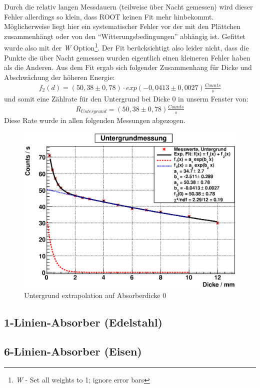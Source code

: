 \documentclass[12pt]{article}
\begin{document}
Durch die relativ langen Messdauern (teilweise über Nacht gemessen) wird dieser Fehler allerdings so klein, dass ROOT keinen Fit mehr hinbekommt.
Möglicherweise liegt hier ein systematischer Fehler vor der mit den Plättchen zusammenhängt oder von den ``Witterungsbedingungen'' abhängig ist.
Gefittet wurde also mit der \textit{W} Option\footnote{\textit{W} - Set all weights to 1; ignore error bars}. Der Fit berücksichtigt also leider nicht, dass die Punkte die über Nacht gemessen wurden eigentlich einen kleineren Fehler haben als die Anderen. Aus dem Fit ergab sich folgender Zusammenhang für Dicke und Abschwächung der höheren Energie:
\begin{align}
 f_2 (d) = (50,38 \pm 0,78) \cdot exp (-0,0413 \pm 0,0027) \frac{Counts}{s}
\end{align}
 und somit eine Zählrate für den Untergrund bei Dicke 0 in unserm Fenster von:
\begin{align}
 R_{Untergrund} = (50,38 \pm 0,78) \frac{Counts}{s} 
\end{align}
Diese Rate wurde in allen folgenden Messungen abgezogen.
       

\begin{figure}[H]
 \includegraphics[width=0.9\linewidth]{pictures/untergrund.eps}
 \caption{Untergrund extrapolation auf Absorberdicke 0}
\end{figure}

\subsection{1-Linien-Absorber (Edelstahl)}

\subsection{6-Linien-Absorber (Eisen)}
\end{document}
